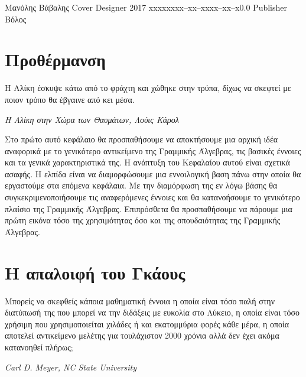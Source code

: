 \documentclass{tstextbook}
\begin{document}
       {Μανόλης Βάβαλης}
       {Cover Designer}
       {2017}
       {xxxxx}{xxx--xx--xxxx--xx--x}{0.0}
       {Publisher}
       {Βόλος}


\chapter{Προθέρμανση}

\epigraph{Η Αλίκη έσκυψε κάτω από το φράχτη και χώθηκε στην τρύπα, δίχως να σκεφτεί με ποιον τρόπο θα έβγαινε από κει μέσα.}{\textit{Η Αλίκη στην Χώρα των Θαυμάτων, Λούις Κάρολ}}

\begin{summary}
  Στο πρώτο αυτό κεφάλαιο θα προσπαθήσουμε να αποκτήσουμε μια αρχική ιδέα αναφορικά με το γενικότερο αντικείμενο της Γραμμικής Άλγεβρας, τις βασικές έννοιες και τα γενικά χαρακτηριστικά της. Η ανάπτυξη του Κεφαλαίου αυτού είναι σχετικά ασαφής. Η ελπίδα είναι να διαμορφώσουμε μια εννοιλογική βαση πάνω στην οποία θα εργαστούμε στα επόμενα κεφάλαια. Mε την διαμόρφωση της εν λόγω βάσης θα συγκεκριμενοποιήσουμε τις αναφερόμενες έννοιες και θα κατανοήσουμε το γενικότερο πλαίσιο της Γραμμικής Άλγεβρας. 
Επιπρόσθετα θα προσπαθήσουμε να πάρουμε μια πρώτη εικόνα τόσο της χρησιμότητας όσο και της σπουδαιότητας της Γραμμικής Άλγεβρας.
\end{summary}



\chapter{Η απαλοιφή του Γκάους}

\epigraph{Μπορείς να σκεφθείς κάποια μαθηματική έννοια η οποία είναι τόσο παλή στην διατύπωσή της που μπορεί να την διδάξεις με ευκολία στο Λύκειο, η οποία είναι τόσο χρήσιμη που χρησιμοποιείται χιλάδες ή και εκατομμύρια φορές κάθε μέρα, η οποία αποτελεί αντικείμενο μελέτης για τουλάχιστον 2000 χρόνια αλλά δεν έχει ακόμα κατανοηθεί πλήρως;}{\textit{Carl D. Meyer, NC State University}}
\end{document}
